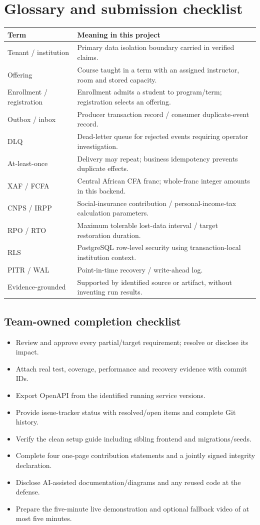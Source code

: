 \documentclass[10pt,a4paper]{article}
\begin{document}
\clearpage
\section{Glossary and submission checklist}
\begin{tabularx}{\textwidth}{@{}L{31mm}Y@{}}
\toprule Term & Meaning in this project\\\midrule
Tenant / institution & Primary data isolation boundary carried in verified claims.\\
Offering & Course taught in a term with an assigned instructor, room and stored capacity.\\
Enrollment / registration & Enrollment admits a student to program/term; registration selects an offering.\\
Outbox / inbox & Producer transaction record / consumer duplicate-event record.\\
DLQ & Dead-letter queue for rejected events requiring operator investigation.\\
At-least-once & Delivery may repeat; business idempotency prevents duplicate effects.\\
XAF / FCFA & Central African CFA franc; whole-franc integer amounts in this backend.\\
CNPS / IRPP & Social-insurance contribution / personal-income-tax calculation parameters.\\
RPO / RTO & Maximum tolerable lost-data interval / target restoration duration.\\
RLS & PostgreSQL row-level security using transaction-local institution context.\\
PITR / WAL & Point-in-time recovery / write-ahead log.\\
Evidence-grounded & Supported by identified source or artifact, without inventing run results.\\
\bottomrule
\end{tabularx}
\subsection{Team-owned completion checklist}
\begin{itemize}
\item Review and approve every partial/target requirement; resolve or disclose its impact.
\item Attach real test, coverage, performance and recovery evidence with commit IDs.
\item Export OpenAPI from the identified running service versions.
\item Provide issue-tracker status with resolved/open items and complete Git history.
\item Verify the clean setup guide including sibling frontend and migrations/seeds.
\item Complete four one-page contribution statements and a jointly signed integrity declaration.
\item Disclose AI-assisted documentation/diagrams and any reused code at the defense.
\item Prepare the five-minute live demonstration and optional fallback video of at most five minutes.
\end{itemize}
\end{document}
